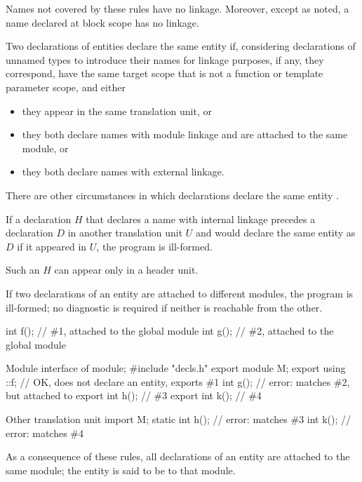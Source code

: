 \pnum
{}%
Names not covered by these rules have no linkage. Moreover, except as
noted, a name declared at block scope has no
linkage.

\pnum
Two declarations of entities declare the same entity
if, considering declarations of unnamed types to introduce their names
for linkage purposes, if any,
they correspond,
have the same target scope that is not a function or template parameter scope,
and either
\begin{itemize}
\item
they appear in the same translation unit, or
\item
they both declare names with module linkage and are attached to the same module, or
\item
they both declare names with external linkage.
\end{itemize}
\begin{note}
There are other circumstances in which declarations declare the same entity%
.
\end{note}

\pnum
If a declaration $H$ that declares a name with internal linkage
precedes a declaration $D$ in another translation unit $U$ and
would declare the same entity as $D$ if it appeared in $U$,
the program is ill-formed.
\begin{note}
Such an $H$ can appear only in a header unit.
\end{note}

\pnum
If two declarations of an entity are
attached to different modules, the program is ill-formed;
no diagnostic is required if neither is reachable from the other.
\begin{example}
\begin{codeblocktu}{}
int f();            // \#1, attached to the global module
int g();            // \#2, attached to the global module
\end{codeblocktu}

\begin{codeblocktu}{Module interface of }
module;
#include "decls.h"
export module M;
export using ::f;   // OK, does not declare an entity, exports \#1
int g();            // error: matches \#2, but attached to 
export int h();     // \#3
export int k();     // \#4
\end{codeblocktu}

\begin{codeblocktu}{Other translation unit}
import M;
static int h();     // error: matches \#3
int k();            // error: matches \#4
\end{codeblocktu}
\end{example}
As a consequence of these rules,
all declarations of an entity are attached to the same module;
the entity is said to be  to that module.

